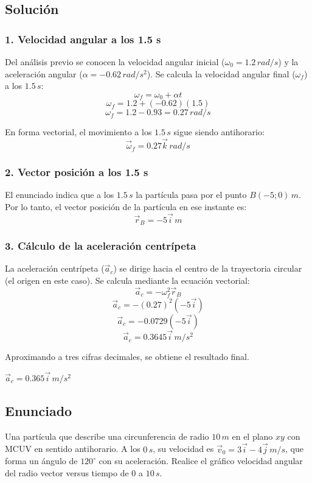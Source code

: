 \documentclass[12pt, a4paper]{article}
\begin{document}
\subsection*{Solución}

\subsubsection*{1. Velocidad angular a los 1.5 s}
Del análisis previo se conocen la velocidad angular inicial ($\omega_0 = 1.2 \, \si{rad/s}$) y la aceleración angular ($\alpha = -0.62 \, \si{rad/s^2}$).
Se calcula la velocidad angular final ($\omega_f$) a los $1.5 \, \si{s}$:
$$ \omega_f = \omega_0 + \alpha t $$
$$ \omega_f = 1.2 + (-0.62)(1.5) $$
$$ \omega_f = 1.2 - 0.93 = 0.27 \, \si{rad/s} $$

En forma vectorial, el movimiento a los $1.5 \, \si{s}$ sigue siendo antihorario:
$$ \vec{\omega}_f = 0.27\vec{k} \, \si{rad/s} $$

\subsubsection*{2. Vector posición a los 1.5 s}
El enunciado indica que a los $1.5 \, \si{s}$ la partícula pasa por el punto $B(-5; 0) \, \si{m}$. 
Por lo tanto, el vector posición de la partícula en ese instante es:
$$ \vec{r}_B = -5\vec{i} \, \si{m} $$

\subsubsection*{3. Cálculo de la aceleración centrípeta}
La aceleración centrípeta ($\vec{a}_c$) se dirige hacia el centro de la trayectoria circular (el origen en este caso). Se calcula mediante la ecuación vectorial:
$$ \vec{a}_c = -\omega_f^2 \vec{r}_B $$
$$ \vec{a}_c = -(0.27)^2 (-5\vec{i}) $$
$$ \vec{a}_c = -0.0729 (-5\vec{i}) $$
$$ \vec{a}_c = 0.3645\vec{i} \, \si{m/s^2} $$

Aproximando a tres cifras decimales, se obtiene el resultado final.

\begin{tcolorbox}[colback=green!5!white, colframe=green!50!black, title=Respuesta Final]
\centering \Large $\vec{a}_c = 0.365\vec{i} \, \si{m/s^2}$
\end{tcolorbox}

\newpage

\subsection*{Enunciado}
Una partícula que describe una circunferencia de radio $10 \, \si{m}$ en el plano $xy$ con MCUV en sentido antihorario. A los $0 \, \si{s}$, su velocidad es $\vec{v}_0 = 3\vec{i} - 4\vec{j} \, \si{m/s}$, que forma un ángulo de $120^\circ$ con su aceleración. Realice el gráfico velocidad angular del radio vector versus tiempo de $0$ a $10 \, \si{s}$.
\end{document}
